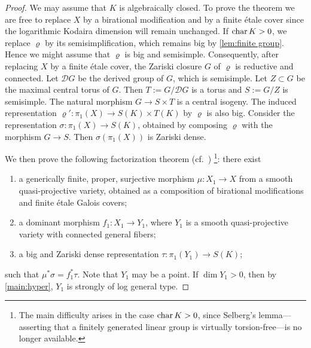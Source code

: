 \documentclass[english]{amsproc}
\theoremstyle{plain}
\theoremstyle{definition}
\theoremstyle{remark}
\theoremstyle{plain}
\numberwithin{equation}{thm} %
\newcommand{\cD}{\mathcal D}
\begin{document}
		\begin{proof}
			We may assume that $K$ is algebraically closed.  To prove the theorem we are free to replace $X$ by a birational modification  and by a finite \'etale cover since the logarithmic Kodaira dimension will remain unchanged. If ${\rm char}\, K > 0$, we replace $\varrho$ by its semisimplification, which
			remains big by \cref{lem:finite group}.
			 Hence we might assume that $\varrho$ is big and semisimple. Consequently, after replacing $X$ by a finite \'etale cover,  the Zariski closure $G$ of $\varrho$ is reductive and connected.  Let $\cD G$ be the derived group of $G$, which is semisimple. Let $Z\subset G$ be the maximal central torus of $G$. Then  $T:=G/\cD G$  is a torus and  $S:=G/Z$ is semisimple.  The natural morphism $G\to  S\times T$  is a central isogeny. 
			The induced representation $\varrho': \pi_1(X)\to  S(K)\times T(K)$ by $\varrho$  is also big.   Consider the  representation $\sigma:\pi_1(X)\to S(K)$, obtained by composing $\varrho$ with the morphism $G \to S$. Then $\sigma(\pi_1(X))$ is Zariski dense.  
			
			We then prove the following factorization theorem
			(cf.~\cite[Proposition~5.9]{DY23b})%
			\footnote{The main difficulty arises in the case ${\rm char}\, K>0$, since
				Selberg's lemma—asserting that a finitely generated linear group is virtually
				torsion-free—is no longer available.}:
			there exist
			\begin{enumerate}[label={\rm (\roman*)}]
				\item a generically finite, proper, surjective morphism
				$\mu \colon X_1 \to X$ from a smooth quasi-projective variety,
				obtained as a composition of birational modifications and finite
				\'etale Galois covers;
				\item a dominant morphism $f_1 \colon X_1 \to Y_1$, where $Y_1$ is a smooth
				quasi-projective variety with connected general fibers;
				\item a big and Zariski dense representation
				$\tau \colon \pi_1(Y_1) \to S(K)$;
			\end{enumerate}
			such that $\mu^*\sigma = f_1^*\tau$.
			Note that $Y_1$ may be a point.
			If $\dim Y_1 > 0$, then by \cref{main:hyper}, $Y_1$ is strongly of log general type.
			
			
			 

\end{proof}
\end{document}
